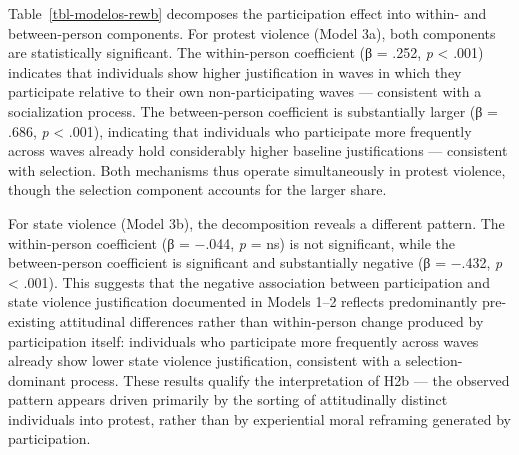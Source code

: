 \documentclass[
  13pt,
]{article}
\begin{document}
Table~\ref{tbl-modelos-rewb} decomposes the participation effect into
within- and between-person components. For protest violence (Model 3a),
both components are statistically significant. The within-person
coefficient (β = .252, \emph{p} \textless{} .001) indicates that
individuals show higher justification in waves in which they participate
relative to their own non-participating waves --- consistent with a
socialization process. The between-person coefficient is substantially
larger (β = .686, \emph{p} \textless{} .001), indicating that
individuals who participate more frequently across waves already hold
considerably higher baseline justifications --- consistent with
selection. Both mechanisms thus operate simultaneously in protest
violence, though the selection component accounts for the larger share.

For state violence (Model 3b), the decomposition reveals a different
pattern. The within-person coefficient (β = −.044, \emph{p} = ns) is not
significant, while the between-person coefficient is significant and
substantially negative (β = −.432, \emph{p} \textless{} .001). This
suggests that the negative association between participation and state
violence justification documented in Models 1--2 reflects predominantly
pre-existing attitudinal differences rather than within-person change
produced by participation itself: individuals who participate more
frequently across waves already show lower state violence justification,
consistent with a selection-dominant process. These results qualify the
interpretation of H2b --- the observed pattern appears driven primarily
by the sorting of attitudinally distinct individuals into protest,
rather than by experiential moral reframing generated by participation.
\end{document}
